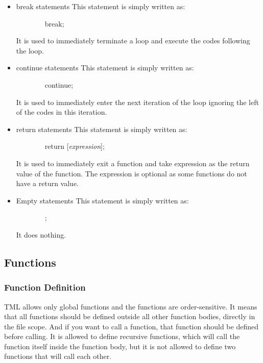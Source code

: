\documentclass[12pt,psfig,a4]{article}
\begin{document}
\begin{itemize}
\item break statements
This statement is simply written as:

\begin{code}
\begin{tabbing}
~~~~~~~~break;
\end{tabbing}
\end{code}

It is used to immediately terminate a loop and execute the codes following the loop.

\item continue statements
This statement is simply written as:

\begin{code}
\begin{tabbing}
~~~~~~~~continue;
\end{tabbing}
\end{code}

It is used to immediately enter the next iteration of the loop ignoring the left of the codes in this iteration.

\item return statements
This statement is simply written as:

\begin{code}
\begin{tabbing}
~~~~~~~~return [\textsl{expression}];
\end{tabbing}
\end{code}

It is used to immediately exit a function and take expression as the return value of the function. The expression is optional as some functions do not have a return value.

\item Empty statements
This statement is simply written as:

\begin{code}
\begin{tabbing}
~~~~~~~~;
\end{tabbing}
\end{code}

It does nothing.

\end{itemize}

\subsection{Functions}

\subsubsection{Function Definition}
TML allows only global functions and the functions are order-sensitive. It means that all functions should be defined outside all other function bodies, directly in the file scope. And if you want to call a function, that function should be defined before calling. It is allowed to define recursive functions, which will call the function itself inside the function body, but it is not allowed to define two functions that will call each other.
\end{document}
